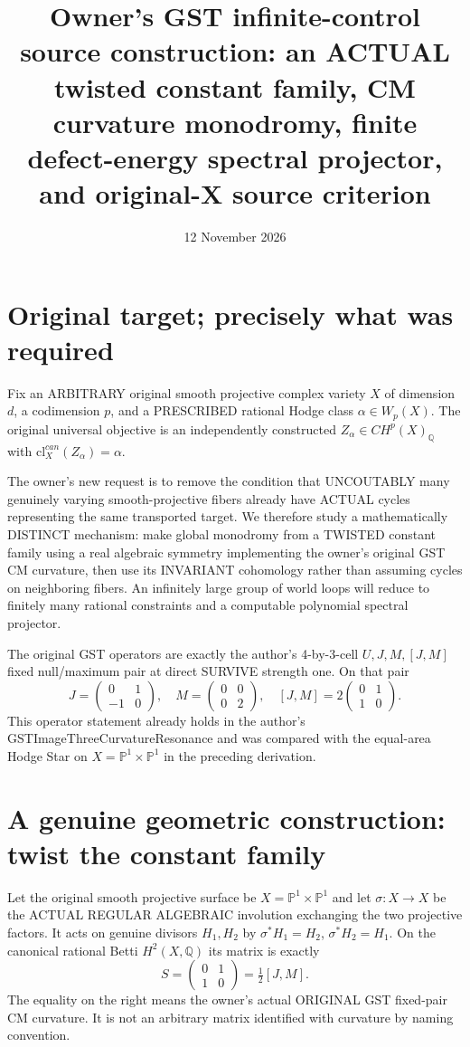 \documentclass[11pt]{article}
\title{Owner's GST infinite-control source construction: an ACTUAL twisted constant family, CM curvature monodromy, finite defect-energy spectral projector, and original-X source criterion}
\date{12 November 2026}
\begin{document}
\maketitle

\section{Original target; precisely what was required}
Fix an ARBITRARY original smooth projective complex variety
$X$ of dimension $d$, a codimension $p$, and a PRESCRIBED
rational Hodge class $\alpha\in W_p(X)$.
The original universal objective is an independently constructed
$Z_\alpha\in CH^p(X)_{\mathbb Q}$ with
$\mathrm{cl}^{can}_X(Z_\alpha)=\alpha$.

The owner's new request is to remove the condition that
UNCOUTABLY many genuinely varying smooth-projective fibers
already have ACTUAL cycles representing the same transported
target. We therefore study a mathematically DISTINCT mechanism:
make global monodromy from a TWISTED constant family using a
real algebraic symmetry implementing the owner's original GST
CM curvature, then use its INVARIANT cohomology rather than
assuming cycles on neighboring fibers. An infinitely large
group of world loops will reduce to finitely many rational
constraints and a computable polynomial spectral projector.

The original GST operators are exactly the author's
4-by-3-cell $U,J,M,[J,M]$ fixed null/maximum pair at
direct SURVIVE strength one. On that pair
\[
J=\begin{pmatrix}0&1\\-1&0\end{pmatrix},\quad
M=\begin{pmatrix}0&0\\0&2\end{pmatrix},\quad
\boxed{[J,M]=2\begin{pmatrix}0&1\\1&0\end{pmatrix}}.
\]
This operator statement already holds in the author's
GSTImageThreeCurvatureResonance and was compared with the
equal-area Hodge Star on
$X=\mathbb P^1\times\mathbb P^1$ in the preceding derivation.

\section{A genuine geometric construction: twist the constant family}

Let the original smooth projective surface be
$X=\mathbb P^1\times\mathbb P^1$ and let
$\sigma:X\to X$ be the ACTUAL REGULAR ALGEBRAIC
involution exchanging the two projective factors.
It acts on genuine divisors $H_1,H_2$ by
$\sigma^*H_1=H_2$, $\sigma^*H_2=H_1$.
On the canonical rational Betti $H^2(X,\mathbb Q)$
its matrix is exactly
\[
S=\begin{pmatrix}0&1\\1&0\end{pmatrix}
=\tfrac12[J,M].
\]
The equality on the right means the owner's
actual ORIGINAL GST fixed-pair CM curvature.
It is not an arbitrary matrix identified with
curvature by naming convention.
\end{document}
